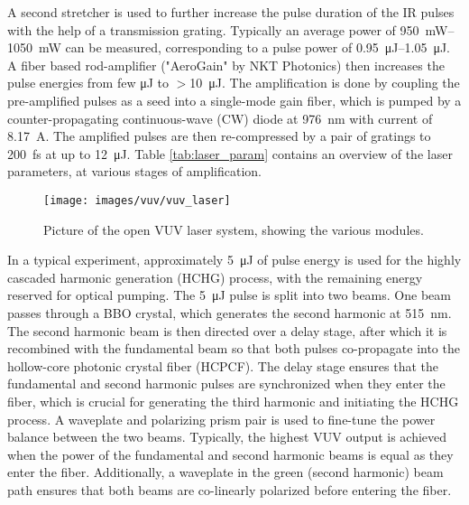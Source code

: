 A second stretcher is used to further increase the pulse duration of the IR pulses with the help of a transmission grating.
Typically an average power of \qtyrange{950}{1050}{\milli\watt} can be measured, corresponding to a pulse power of \qtyrange{0.95}{1.05}{\micro\joule}.
A fiber based rod-amplifier ("AeroGain" by NKT Photonics) then increases the pulse energies from few \unit{\micro\joule} to $>$\qty{10}{\micro\joule}.
The amplification is done by coupling the pre-amplified pulses as a seed into a single-mode gain fiber, which is pumped by a counter-propagating continuous-wave (CW) diode at \qty{976}{\nano\meter} with current of \qty{8.17}{\ampere}.
The amplified pulses are then re-compressed by a pair of gratings to \qty{200}{\femto\second} at up to \qty{12}{\micro\joule}.
Table \ref{tab:laser_param} contains an overview of the laser parameters, at various stages of amplification.

\begin{figure}
	\centering
	\texttt{[image: images/vuv/vuv\_laser]}
	\caption{Picture of the open VUV laser system, showing the various modules.}
	\label{fig:vuvlaser}
\end{figure}

In a typical experiment, approximately \qty{5}{\micro\joule} of pulse energy is used for the highly cascaded harmonic generation (HCHG) process, with the remaining energy reserved for optical pumping.
The \qty{5}{\micro\joule} pulse is split into two beams.
One beam passes through a BBO crystal, which generates the second harmonic at \qty{515}{\nano\meter}.
The second harmonic beam is then directed over a delay stage, after which it is recombined with the fundamental beam so that both pulses co-propagate into the hollow-core photonic crystal fiber (HCPCF).
The delay stage ensures that the fundamental and second harmonic pulses are synchronized when they enter the fiber, which is crucial for generating the third harmonic and initiating the HCHG process.
A waveplate and polarizing prism pair is used to fine-tune the power balance between the two beams.
Typically, the highest VUV output is achieved when the power of the fundamental and second harmonic beams is equal as they enter the fiber.
Additionally, a waveplate in the green (second harmonic) beam path ensures that both beams are co-linearly polarized before entering the fiber.

